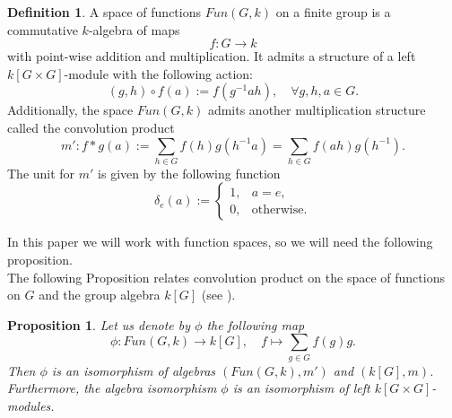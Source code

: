 \documentclass[12pt,reqno]{amsart}
\newtheorem{prop}[thm]{Proposition}
\theoremstyle{definition}
\newtheorem{defn}[thm]{Definition}
\theoremstyle{remark}
\numberwithin{equation}{section}
\begin{document}
\begin{defn}\label{convolution}
    A space of functions $Fun(G,k)$ on a finite group is a commutative $k$-algebra of maps
    \begin{equation*}
        f: G \rightarrow k
    \end{equation*}
    with point-wise addition and multiplication. It admits a structure of a left $k[G\times G]$-module with the following action:
    \begin{equation*}
        (g,h)\circ f(a):= f(g^{-1} a h), \quad \forall g,h,a\in G.
    \end{equation*}
    Additionally, the space $Fun(G,k)$ admits another multiplication structure called the convolution product
    \begin{equation*}
        m': f*g(a) :=\sum_{h\in G} f(h)g(h^{-1}a)=\sum_{h\in G} f(ah)g(h^{-1}).
    \end{equation*}
    The unit for $m'$ is given by the following function
    \begin{equation*}
        \delta_e(a):=\begin{cases}
            1, & a=e,\\
            0, & \text{otherwise.}
        \end{cases}
    \end{equation*}
\end{defn}

In this paper we will work with function spaces, so we will need the following proposition.\\

The following Proposition relates convolution product on the space of functions on $G$ and the group algebra $k[G]$ (see \cite[Section 2, Lemma 1]{DB}).

\begin{prop}\label{Functions-group_algebra_correspondence}
    Let us denote by $\phi$ the following map
    \begin{equation}\label{fun_iso}
        \phi: Fun(G,k) \rightarrow k[G], \quad f \mapsto \sum_{g\in G} f(g) g.
    \end{equation}
    Then $\phi$ is an isomorphism of algebras $(Fun(G,k),m')$ and $(k[G],m)$. Furthermore, the algebra isomorphism $\phi$ is an isomorphism of left $k[G \times G]$-modules.
\end{prop}

\end{document}
